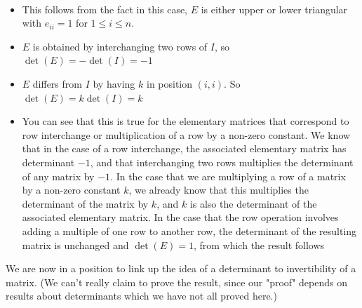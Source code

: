 \documentclass{report}
\begin{document}
\begin{myproof}
    ~\\
    \begin{itemize}
        \item This follows from the fact in this case, $E$ is either upper or lower triangular with  $e_{ii} = 1$ for $1 \le i \le n$.
         \item $E$ is obtained by interchanging two rows of  $I$, so  $\det (E) = -\det (I) = -1$
         \item  $E$ differs from  $I$ by having $k$ in position $(i,i)$. So $\det (E) = k\det(I) = k$
         \item You can see that this is true for the elementary matrices that correspond to row
interchange or multiplication of a row by a non-zero constant. We know that in the
case of a row interchange, the associated elementary matrix has determinant $-1$,
and that interchanging two rows multiplies the determinant of any matrix by $-1$.
In the case that we are multiplying a row of a matrix by a non-zero constant $k$,
we already know that this multiplies the determinant of the matrix by $k$, and $k$ is
also the determinant of the associated elementary matrix. In the case that the row
operation involves adding a multiple of one row to another row, the determinant
of the resulting matrix is unchanged and $\det (E) = 1$, from
which the result follows
    \end{itemize}
\end{myproof}


We are now in a position to link up the idea of a determinant to invertibility of
a matrix. (We can't really claim to prove the result, since our "proof" depends on
results about determinants which we have not all proved here.)
\end{document}
